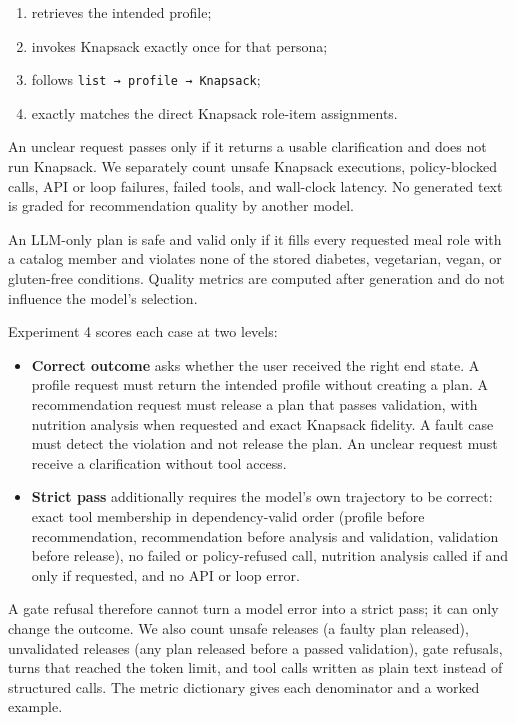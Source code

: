 \documentclass[
  10pt,
  letterpaper,
]{article}
\providecommand{\tightlist}{%
  \setlength{\itemsep}{0pt}\setlength{\parskip}{0pt}}
\begin{document}
\begin{enumerate}
\def\labelenumi{\arabic{enumi}.}
\tightlist
\item
  retrieves the intended profile;
\item
  invokes Knapsack exactly once for that persona;
\item
  follows \texttt{list\ →\ profile\ →\ Knapsack};
\item
  exactly matches the direct Knapsack role-item assignments.
\end{enumerate}

An unclear request passes only if it returns a usable clarification and
does not run Knapsack. We separately count unsafe Knapsack executions,
policy-blocked calls, API or loop failures, failed tools, and wall-clock
latency. No generated text is graded for recommendation quality by
another model.

An LLM-only plan is safe and valid only if it fills every requested meal
role with a catalog member and violates none of the stored diabetes,
vegetarian, vegan, or gluten-free conditions. Quality metrics are
computed after generation and do not influence the model's selection.

Experiment 4 scores each case at two levels:

\begin{itemize}
\tightlist
\item
  \textbf{Correct outcome} asks whether the user received the right end
  state. A profile request must return the intended profile without
  creating a plan. A recommendation request must release a plan that
  passes validation, with nutrition analysis when requested and exact
  Knapsack fidelity. A fault case must detect the violation and not
  release the plan. An unclear request must receive a clarification
  without tool access.
\item
  \textbf{Strict pass} additionally requires the model's own trajectory
  to be correct: exact tool membership in dependency-valid order
  (profile before recommendation, recommendation before analysis and
  validation, validation before release), no failed or policy-refused
  call, nutrition analysis called if and only if requested, and no API
  or loop error.
\end{itemize}

A gate refusal therefore cannot turn a model error into a strict pass;
it can only change the outcome. We also count unsafe releases (a faulty
plan released), unvalidated releases (any plan released before a passed
validation), gate refusals, turns that reached the token limit, and tool
calls written as plain text instead of structured calls. The metric
dictionary gives each denominator and a worked example.
\end{document}
